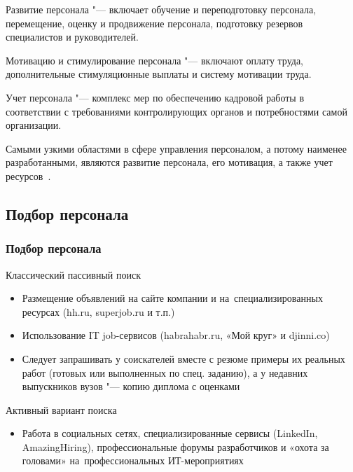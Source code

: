 \documentclass{../industrial-development}
\begin{document}
\lecturenotes

\alert{Развитие персонала} "--- включает обучение и переподготовку персонала, перемещение, оценку и продвижение персонала, подготовку резервов специалистов и руководителей.

\alert{Мотивацию и стимулирование персонала} "--- включают оплату труда, дополнительные стимуляционные выплаты и систему мотивации труда.

\alert{Учет персонала} "--- комплекс мер по обеспечению кадровой работы в соответствии с требованиями контролирующих органов и потребностями самой организации. 

Самыми узкими областями в сфере управления персоналом, а потому наименее разработанными, являются развитие персонала, его мотивация, а также учет ресурсов~\cite[с.~52]{Nelarin}.


\subsection{Подбор персонала}

\begin{frame} \frametitle{Подбор персонала}
	Классический пассивный поиск
  \begin{itemize}
	\item Размещение объявлений на сайте компании и на~специализированных ресурсах (hh.ru, superjob.ru и т.п.)
	\item Использование IT job-сервисов (habrahabr.ru, «Мой круг» и djinni.co)
	\item Следует запрашивать у соискателей вместе с резюме примеры их реальных работ (готовых или выполненных по спец. заданию), а у недавних выпускников вузов "--- копию диплома с оценками 
	  \end{itemize}
	
Активный вариант поиска
		  \begin{itemize}
		  \item Работа в социальных сетях, специализированные сервисы (LinkedIn, AmazingHiring), профессиональные форумы разработчиков и «охота за головами» на~профессиональных ИТ-мероприятиях 
		  \end{itemize}
\end{frame}

\lecturenotes
\end{document}

